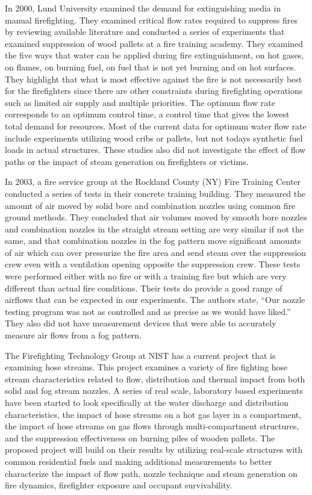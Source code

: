 \documentclass[12pt,oneside]{book}
\begin{document}
In 2000, Lund University examined the demand for extinguishing media in manual firefighting. They examined critical flow rates required to suppress fires by reviewing available literature and conducted a series of experiments that examined suppression of wood pallets at a fire training academy. They examined the five ways that water can be applied during fire extinguishment, on hot gases, on flames, on burning fuel, on fuel that is not yet burning and on hot surfaces. They highlight that what is most effective against the fire is not necessarily best for the firefighters since there are other constraints during firefighting operations such as limited air supply and multiple priorities. The optimum flow rate corresponds to an optimum control time, a control time that gives the lowest total demand for resources. Most of the current data for optimum water flow rate include experiments utilizing wood cribs or pallets, but not todays synthetic fuel loads in actual structures.  These studies also did not investigate the effect of flow paths or the impact of steam generation on firefighters or victims.

In 2003, a fire service group at the Rockland County (NY) Fire Training Center conducted a series of tests in their concrete training building. They measured the amount of air moved by solid bore and combination nozzles using common fire ground methods. They concluded that air volumes moved by smooth bore nozzles and combination nozzles in the straight stream setting are very similar if not the same, and that combination nozzles in the fog pattern move significant amounts of air which can over pressurize the fire area and send steam over the suppression crew even with a ventilation opening opposite the suppression crew. These tests were performed either with no fire or with a training fire but which are very different than actual fire conditions. Their tests do provide a good range of airflows that can be expected in our experiments. The authors state, “Our nozzle testing program was not as controlled and as precise as we would have liked.” They also did not have measurement devices that were able to accurately measure air flows from a fog pattern.  

The Firefighting Technology Group at NIST has a current project that is examining hose streams. This project examines a variety of fire fighting hose stream characteristics related to flow, distribution and thermal impact from both solid and fog stream nozzles. A series of real scale, laboratory based experiments have been started to look specifically at the water discharge and distribution characteristics, the impact of hose streams on a hot gas layer in a compartment, the impact of hose streams on gas flows through multi-compartment structures, and the suppression effectiveness on burning piles of wooden pallets. The proposed project will build on their results by utilizing real-scale structures with common residential fuels and making additional measurements to better characterize the impact of flow path, nozzle technique and steam generation on fire dynamics, firefighter exposure and occupant survivability.
\end{document}
